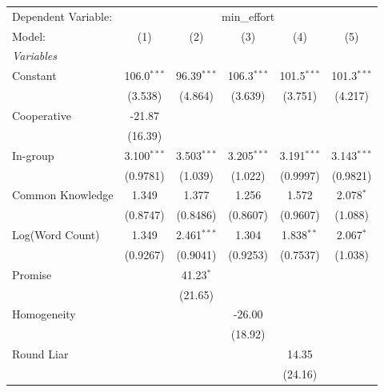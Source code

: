 
\begingroup
\centering
\begin{tabular}{lccccc}
   \tabularnewline \midrule \midrule
   Dependent Variable: & \multicolumn{5}{c}{min\_effort}\\
   Model:           & (1)           & (2)           & (3)           & (4)           & (5)\\  
   \midrule
   \emph{Variables}\\
   Constant         & 106.0$^{***}$ & 96.39$^{***}$ & 106.3$^{***}$ & 101.5$^{***}$ & 101.3$^{***}$\\   
                    & (3.538)       & (4.864)       & (3.639)       & (3.751)       & (4.217)\\   
   Cooperative      & -21.87        &               &               &               &   \\   
                    & (16.39)       &               &               &               &   \\   
   In-group         & 3.100$^{***}$ & 3.503$^{***}$ & 3.205$^{***}$ & 3.191$^{***}$ & 3.143$^{***}$\\   
                    & (0.9781)      & (1.039)       & (1.022)       & (0.9997)      & (0.9821)\\   
   Common Knowledge & 1.349         & 1.377         & 1.256         & 1.572         & 2.078$^{*}$\\   
                    & (0.8747)      & (0.8486)      & (0.8607)      & (0.9607)      & (1.088)\\   
   Log(Word Count)  & 1.349         & 2.461$^{***}$ & 1.304         & 1.838$^{**}$  & 2.067$^{*}$\\   
                    & (0.9267)      & (0.9041)      & (0.9253)      & (0.7537)      & (1.038)\\   
   Promise          &               & 41.23$^{*}$   &               &               &   \\   
                    &               & (21.65)       &               &               &   \\   
   Homogeneity      &               &               & -26.00        &               &   \\   
                    &               &               & (18.92)       &               &   \\   
   Round Liar       &               &               &               & 14.35         &   \\   
                    &               &               &               & (24.16)       &   \\   

\end{tabular}
